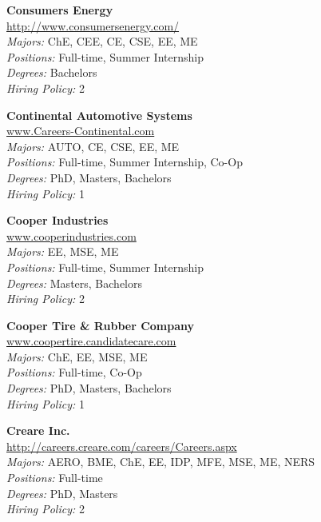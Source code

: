 \documentclass[twoside]{article}
\begin{document}
\begin{center}
\begin{multicols}{3}
\begin{minipage}{.9\columnwidth}{\Large\bf Consumers Energy }\\
	\url{http://www.consumersenergy.com/}\\
	\emph{Majors:} ChE, CEE, CE, CSE, EE, ME\\
	\emph{Positions:} Full-time, Summer Internship\\
	\emph{Degrees:} Bachelors\\
	\emph{Hiring Policy:} 2\\
\end{minipage}
 
\begin{minipage}{.9\columnwidth}{\Large\bf Continental Automotive Systems }\\
	\url{www.Careers-Continental.com}\\
	\emph{Majors:} AUTO, CE, CSE, EE, ME\\
	\emph{Positions:} Full-time, Summer Internship, Co-Op\\
	\emph{Degrees:} PhD, Masters, Bachelors\\
	\emph{Hiring Policy:} 1\\
\end{minipage}
 
\begin{minipage}{.9\columnwidth}{\Large\bf Cooper Industries }\\
	\url{www.cooperindustries.com}\\
	\emph{Majors:} EE, MSE, ME\\
	\emph{Positions:} Full-time, Summer Internship\\
	\emph{Degrees:} Masters, Bachelors\\
	\emph{Hiring Policy:} 2\\
\end{minipage}
 
\begin{minipage}{.9\columnwidth}{\Large\bf Cooper Tire \& Rubber Company }\\
	\url{www.coopertire.candidatecare.com}\\
	\emph{Majors:} ChE, EE, MSE, ME\\
	\emph{Positions:} Full-time, Co-Op\\
	\emph{Degrees:} PhD, Masters, Bachelors\\
	\emph{Hiring Policy:} 1\\
\end{minipage}
 
\begin{minipage}{.9\columnwidth}{\Large\bf Creare Inc. }\\
	\url{http://careers.creare.com/careers/Careers.aspx}\\
	\emph{Majors:} AERO, BME, ChE, EE, IDP, MFE, MSE, ME, NERS\\
	\emph{Positions:} Full-time\\
	\emph{Degrees:} PhD, Masters\\
	\emph{Hiring Policy:} 2\\
\end{minipage}
 

\end{multicols}
\end{center}
\end{document}
